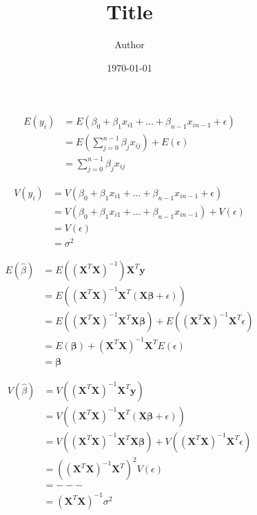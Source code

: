 \documentclass[11pt,a4paper,oldfontcommands]{memoir}
\title{Title}
\author{Author}
\date{\today}
\begin{document}
\begin{align*}
    E(y_i) &= E(\beta_0 + \beta_1x_{i1} + \dots + \beta_{n-1} x_{i n-1} + \epsilon)\\
    &= E\left(\sum_{j=0}^{n-1}\beta_{j}x_{ij}\right) + E(\epsilon)\\
    &= \sum_{j=0}^{n-1}\beta_{j}x_{ij}
\end{align*}

\begin{align*}
    V(y_i) &= V(\beta_0 + \beta_1x_{i1} + \dots + \beta_{n-1} x_{i n-1} + \epsilon)\\
    &= V(\beta_0 + \beta_1x_{i1} + \dots + \beta_{n-1} x_{i n-1}) + V(\epsilon)\\
    &= V(\epsilon)\\
    &= \sigma^2
\end{align*}

\begin{align*}
    E(\hat \beta) &= E((\boldsymbol{X}^T \boldsymbol{X})^{-1})\boldsymbol{X}^T \boldsymbol{y}\\
    &= E((\boldsymbol{X}^T\boldsymbol{X})^{-1} \boldsymbol{X}^T(\boldsymbol{X}\boldsymbol{\beta} + \epsilon))\\
    &= E((\boldsymbol{X}^T\boldsymbol{X})^{-1} \boldsymbol{X}^T\boldsymbol{X}\boldsymbol{\beta}) + E((\boldsymbol{X}^T\boldsymbol{X})^{-1} \boldsymbol{X}^T\epsilon)\\
    &=E(\boldsymbol{\beta}) + (\boldsymbol{X}^T\boldsymbol{X})^{-1} \boldsymbol{X}^TE(\epsilon)\\
    &= \boldsymbol{\beta}
\end{align*}

\begin{align*}
    V(\hat \beta) &= V((\boldsymbol{X}^T\boldsymbol{X})^{-1} \boldsymbol{X}^T\boldsymbol{y})\\
    &= V((\boldsymbol{X}^T\boldsymbol{X})^{-1} \boldsymbol{X}^T(\boldsymbol{X}\boldsymbol{\beta} + \epsilon))\\
    &= V((\boldsymbol{X}^T\boldsymbol{X})^{-1} \boldsymbol{X}^T\boldsymbol{X}\boldsymbol{\beta}) + V((\boldsymbol{X}^T\boldsymbol{X})^{-1} \boldsymbol{X}^T \epsilon)\\
    &= ((\boldsymbol{X}^T\boldsymbol{X})^{-1} \boldsymbol{X}^T)^2 V(\epsilon)\\
    &= ---\\
    &= (\boldsymbol{X}^T\boldsymbol{X})^{-1}\sigma^2
\end{align*}
\end{document}
